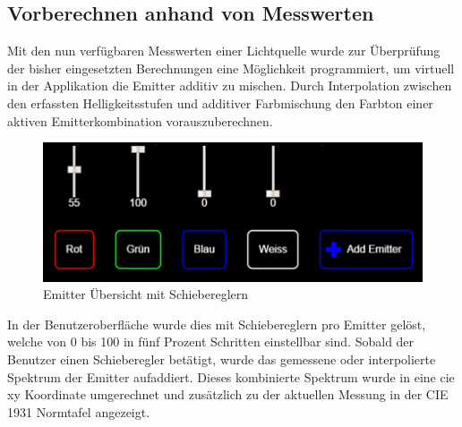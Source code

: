 \documentclass[11pt]{scrartcl}
\begin{document}
\subsection{Vorberechnen anhand von Messwerten}
Mit den nun verfügbaren Messwerten einer Lichtquelle wurde zur Überprüfung der bisher eingesetzten Berechnungen eine Möglichkeit programmiert,
um virtuell in der Applikation die Emitter additiv zu mischen. Durch Interpolation zwischen den erfassten Helligkeitsstufen und additiver
Farbmischung den Farbton einer aktiven Emitterkombination vorauszuberechnen.
\begin{figure}[H]
    \begin{center}
        \includegraphics[width=.9\textwidth]{images/app_emitters_with_sliders_v1.png}
    \end{center}
    \caption{Emitter Übersicht mit Schiebereglern}\label{fig:emitterFaders}
\end{figure}
\noindent
In der Benutzeroberfläche wurde dies mit Schiebereglern pro Emitter gelöst, welche von 0 bis 100 in fünf Prozent Schritten einstellbar sind.
Sobald der Benutzer einen Schieberegler betätigt, wurde das gemessene oder interpolierte Spektrum der Emitter aufaddiert. Dieses kombinierte
Spektrum wurde in eine \ac{cie} xy Koordinate umgerechnet und zusätzlich zu der aktuellen Messung in der CIE 1931 Normtafel angezeigt.
\end{document}
